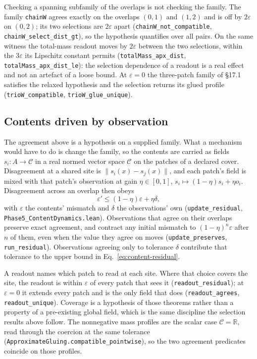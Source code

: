 \documentclass{article}
\begin{document}
Checking a spanning subfamily of the overlaps is not checking the family. The
family \texttt{chainW} agrees exactly on the overlaps $(0,1)$ and $(1,2)$ and is
off by $2\varepsilon$ on $(0,2)$; its two selections are $2\varepsilon$ apart
(\nolinkurl{chainW_not_compatible},
\nolinkurl{chainW_select_dist_gt}), so the
hypothesis quantifies over all pairs. On the same witness the total-mass readout
moves by $2\varepsilon$ between the two selections, within the $3\varepsilon$
its Lipschitz constant permits
(\nolinkurl{totalMass_apx_dist},
\nolinkurl{totalMass_apx_dist_le}): the
selection dependence of a readout is a real effect and not an artefact of a
loose bound. At $\varepsilon=0$ the three-patch family of \S17.1 satisfies the
relaxed hypothesis and the selection returns its glued profile
(\nolinkurl{trioW_compatible},
\nolinkurl{trioW_glue_unique}).

\subsection{Contents driven by observation}
\label{sec:content-dynamics}

The agreement above is a hypothesis on a supplied family. What a mechanism
would have to do is change the family, so the contents are carried as fields
$s_i:A\to\mathcal{C}$ in a real normed vector space $\mathcal{C}$ on the patches of a declared
cover. Disagreement at a shared site is $\|s_i(x)-s_j(x)\|$, and each patch's field
is mixed with that patch's observation at gain $\eta\in[0,1]$,
$s_i\mapsto(1-\eta)s_i+\eta o_i$. Disagreement across an overlap then obeys
\begin{equation}
 \varepsilon'\leq(1-\eta)\varepsilon+\eta\delta,
 \label{eq:content-residual}
\end{equation}
with $\varepsilon$ the contents' mismatch and $\delta$ the observations' own
(\nolinkurl{update_residual},
\nolinkurl{Phase5_ContentDynamics.lean}).
Observations that agree on their
overlaps preserve exact agreement, and contract any initial mismatch to
$(1-\eta)^{n}\varepsilon$ after $n$ of them, even when the value they agree
on moves (\nolinkurl{update_preserves},
\nolinkurl{run_residual}). Observations agreeing only to tolerance
$\delta$ contribute that tolerance to the upper bound in
Eq.~\eqref{eq:content-residual}.

A readout names which patch to read at each site. Where that choice covers the
site, the readout is within $\varepsilon$ of every patch that sees it
(\nolinkurl{readout_residual}); at $\varepsilon=0$ it extends every
patch and is the only field that does
(\nolinkurl{readout_agrees}, \nolinkurl{readout_unique}).
Coverage is a hypothesis of those theorems rather than a property of a
pre-existing global field, which is the same discipline the selection results
above follow. The nonnegative mass profiles are the scalar case $\mathcal{C}=\mathbb{R}$,
read through the coercion at the same tolerance
(\nolinkurl{ApproximateGluing.compatible_pointwise}), so the two
agreement predicates coincide on those profiles.
\end{document}
